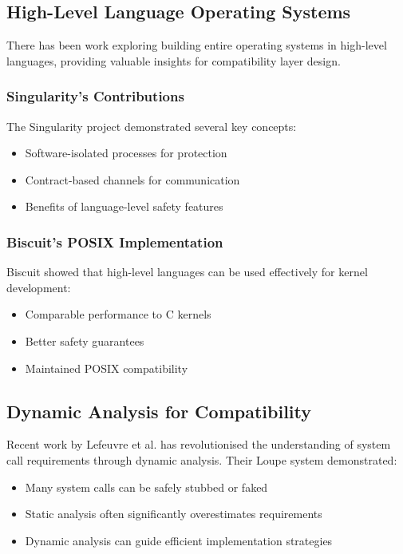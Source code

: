 \documentclass[conference]{IEEEtran}
\begin{document}
\subsection{High-Level Language Operating Systems}
There has been work exploring building entire operating systems in high-level languages, providing valuable insights for compatibility layer design.

\subsubsection{Singularity's Contributions}
The Singularity project \cite{singularity} demonstrated several key concepts:
\begin{itemize}
	\item Software-isolated processes for protection
	\item Contract-based channels for communication
	\item Benefits of language-level safety features
\end{itemize}

\subsubsection{Biscuit's POSIX Implementation}
Biscuit \cite{go_kernel} showed that high-level languages can be used effectively for kernel development:
\begin{itemize}
	\item Comparable performance to C kernels
	\item Better safety guarantees
	\item Maintained POSIX compatibility
\end{itemize}

\subsection{Dynamic Analysis for Compatibility}
Recent work by Lefeuvre et al. \cite{lefeuvre2024loupe} has revolutionised the understanding of system call requirements through dynamic analysis. Their Loupe system demonstrated:
\begin{itemize}
	\item Many system calls can be safely stubbed or faked
	\item Static analysis often significantly overestimates requirements
	\item Dynamic analysis can guide efficient implementation strategies
\end{itemize}
\end{document}
